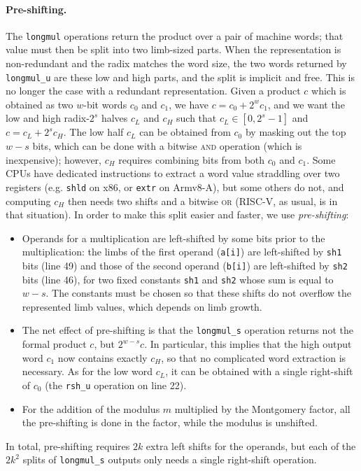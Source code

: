 \documentclass{llncs}
\begin{document}
\paragraph{Pre-shifting.}
The \verb+longmul+ operations return the product over a pair of machine
words; that value must then be split into two limb-sized parts. When the
representation is non-redundant and the radix matches the word size, the
two words returned by \verb+longmul_u+ are these low and high parts, and
the split is implicit and free. This is no longer the case with a
redundant representation. Given a product $c$ which is obtained as two
$w$-bit words $c_0$ and $c_1$, we have $c = c_0 + 2^w c_1$, and we want
the low and high radix-$2^s$ halves $c_L$ and $c_H$ such that $c_L \in
[0, 2^s - 1]$ and $c = c_L + 2^s c_H$. The low half $c_L$ can be
obtained from $c_0$ by masking out the top $w-s$ bits, which can be done
with a bitwise \textsc{and} operation (which is inexpensive); however,
$c_H$ requires combining bits from both $c_0$ and $c_1$. Some CPUs have
dedicated instructions to extract a word value straddling over two
registers (e.g. \verb+shld+ on x86, or \verb+extr+ on Armv8-A), but some
others do not, and computing $c_H$ then needs two shifts and a bitwise
\textsc{or} (RISC-V, as usual, is in that situation). In order to make
this split easier and faster, we use \emph{pre-shifting}:
\begin{itemize}

    \item Operands for a multiplication are left-shifted by some bits
    prior to the multiplication: the limbs of the first operand
    (\verb+a[i]+) are left-shifted by \verb+sh1+ bits (line 49) and
    those of the second operand (\verb+b[i]+) are left-shifted by
    \verb+sh2+ bits (line 46), for two fixed constants \verb+sh1+
    and \verb+sh2+ whose sum is equal to $w-s$. The constants must be
    chosen so that these shifts do not overflow the represented limb
    values, which depends on limb growth.

    \item The net effect of pre-shifting is that the \verb+longmul_s+
    operation returns not the formal product $c$, but $2^{w-s} c$. In
    particular, this implies that the high output word $c_1$ now
    contains exactly $c_H$, so that no complicated word extraction is
    necessary. As for the low word $c_L$, it can be obtained with a
    single right-shift of $c_0$ (the \verb+rsh_u+ operation on line 22).

    \item For the addition of the modulus $m$ multiplied by the
    Montgomery factor, all the pre-shifting is done in the factor,
    while the modulus is unshifted.

\end{itemize}
In total, pre-shifting requires $2k$ extra left shifts for the operands,
but each of the $2k^2$ splits of \verb+longmul_s+ outputs only needs a
single right-shift operation.
\end{document}
